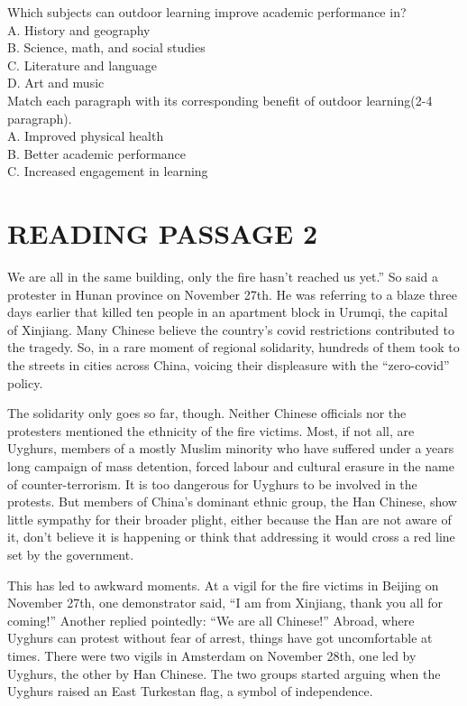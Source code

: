 \documentclass[10pt, a4paper, oneside]{article}
\begin{document}
\begin{spacing}{2.0}
Which subjects can outdoor learning improve academic performance in?\\
A. History and geography\\
B. Science, math, and social studies\\
C. Literature and language\\
D. Art and music\\

Match each paragraph with its corresponding benefit of outdoor learning(2-4 paragraph).\\
A. Improved physical health\\
B. Better academic performance\\
C. Increased engagement in learning\\

\section{READING PASSAGE 2}
We are all in the same building, only the fire hasn't reached us yet.” So said a protester in Hunan province on November 27th. 
He was referring to a blaze three days earlier that killed ten people in an apartment block in Urumqi, the capital of Xinjiang. 
Many Chinese believe the country's covid restrictions contributed to the tragedy. So, in a rare moment of regional solidarity, 
hundreds of them took to the streets in cities across China, voicing their displeasure with the “zero-covid” policy.

The solidarity only goes so far, though. Neither Chinese officials nor the protesters mentioned the ethnicity of the fire victims. 
Most, if not all, are Uyghurs, members of a mostly Muslim minority who have suffered under a years long campaign of mass detention, 
forced labour and cultural erasure in the name of counter-terrorism. It is too dangerous for Uyghurs to be involved in the protests. 
But members of China's dominant ethnic group, the Han Chinese, show little sympathy for their broader plight, either 
because the Han are not aware of it, don't believe it is happening or think that addressing it would cross a red line set by the government.

This has led to awkward moments. At a vigil for the fire victims in Beijing on November 27th, one demonstrator said, 
“I am from Xinjiang, thank you all for coming!” Another replied pointedly: “We are all Chinese!” Abroad, where Uyghurs can protest without 
fear of arrest, things have got uncomfortable at times. There were two vigils in Amsterdam on November 28th, one led by Uyghurs, 
the other by Han Chinese. The two groups started arguing when the Uyghurs raised an East Turkestan flag, a symbol of independence. 


\end{spacing}
\end{document}
